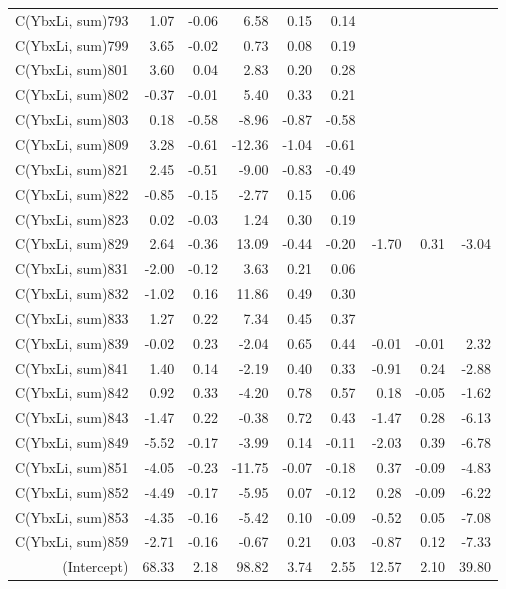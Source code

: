 \begin{table}[p]
\begin{tabular}{rrrrrrrrr}
  C(YbxLi, sum)793 & 1.07 & -0.06 & 6.58 & 0.15 & 0.14 &  &  &  \\ 
  C(YbxLi, sum)799 & 3.65 & -0.02 & 0.73 & 0.08 & 0.19 &  &  &  \\ 
  C(YbxLi, sum)801 & 3.60 & 0.04 & 2.83 & 0.20 & 0.28 &  &  &  \\ 
  C(YbxLi, sum)802 & -0.37 & -0.01 & 5.40 & 0.33 & 0.21 &  &  &  \\ 
  C(YbxLi, sum)803 & 0.18 & -0.58 & -8.96 & -0.87 & -0.58 &  &  &  \\ 
  C(YbxLi, sum)809 & 3.28 & -0.61 & -12.36 & -1.04 & -0.61 &  &  &  \\ 
  C(YbxLi, sum)821 & 2.45 & -0.51 & -9.00 & -0.83 & -0.49 &  &  &  \\ 
  C(YbxLi, sum)822 & -0.85 & -0.15 & -2.77 & 0.15 & 0.06 &  &  &  \\ 
  C(YbxLi, sum)823 & 0.02 & -0.03 & 1.24 & 0.30 & 0.19 &  &  &  \\ 
  C(YbxLi, sum)829 & 2.64 & -0.36 & 13.09 & -0.44 & -0.20 & -1.70 & 0.31 & -3.04 \\ 
  C(YbxLi, sum)831 & -2.00 & -0.12 & 3.63 & 0.21 & 0.06 &  &  &  \\ 
  C(YbxLi, sum)832 & -1.02 & 0.16 & 11.86 & 0.49 & 0.30 &  &  &  \\ 
  C(YbxLi, sum)833 & 1.27 & 0.22 & 7.34 & 0.45 & 0.37 &  &  &  \\ 
  C(YbxLi, sum)839 & -0.02 & 0.23 & -2.04 & 0.65 & 0.44 & -0.01 & -0.01 & 2.32 \\ 
  C(YbxLi, sum)841 & 1.40 & 0.14 & -2.19 & 0.40 & 0.33 & -0.91 & 0.24 & -2.88 \\ 
  C(YbxLi, sum)842 & 0.92 & 0.33 & -4.20 & 0.78 & 0.57 & 0.18 & -0.05 & -1.62 \\ 
  C(YbxLi, sum)843 & -1.47 & 0.22 & -0.38 & 0.72 & 0.43 & -1.47 & 0.28 & -6.13 \\ 
  C(YbxLi, sum)849 & -5.52 & -0.17 & -3.99 & 0.14 & -0.11 & -2.03 & 0.39 & -6.78 \\ 
  C(YbxLi, sum)851 & -4.05 & -0.23 & -11.75 & -0.07 & -0.18 & 0.37 & -0.09 & -4.83 \\ 
  C(YbxLi, sum)852 & -4.49 & -0.17 & -5.95 & 0.07 & -0.12 & 0.28 & -0.09 & -6.22 \\ 
  C(YbxLi, sum)853 & -4.35 & -0.16 & -5.42 & 0.10 & -0.09 & -0.52 & 0.05 & -7.08 \\ 
  C(YbxLi, sum)859 & -2.71 & -0.16 & -0.67 & 0.21 & 0.03 & -0.87 & 0.12 & -7.33 \\ 
  (Intercept) & 68.33 & 2.18 & 98.82 & 3.74 & 2.55 & 12.57 & 2.10 & 39.80 \\ 
   \hline
\end{tabular}
\end{table}
